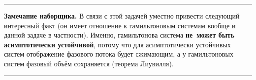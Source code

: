 \documentclass[a4paper,12pt]{article}
\newenvironment{nbb}{\par\vskip3pt\hrule\vskip3pt\textbf{\footnotesize Замечание наборщика.}\footnotesize }
{\vskip3pt\hrule\par\vskip3pt}
\begin{document}
\begin{nbb}
В связи с этой задачей уместно привести следующий интересный факт (он имеет отношение
к гамильтоновым системам вообще и данной задаче в частности). Именно, гамильтонова система
\textbf{не~может быть асимптотически устойчивой}, потому что для асимптотически устойчивых систем
отображение фазового потока будет сжимающим, а у гамильтоновых систем фазовый объём сохраняется
(теорема Лиувилля).
\end{nbb}
\end{document}
